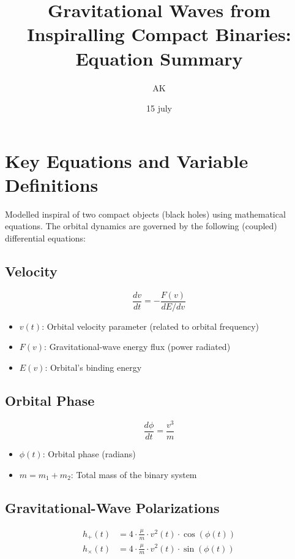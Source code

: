 \documentclass {article}
\title {Gravitational Waves from Inspiralling Compact Binaries: Equation Summary}
\author {AK}
\date {15 july}
\begin{document}
\maketitle

\section*{Key Equations and Variable Definitions}

Modelled inspiral of two compact objects (black holes) using mathematical equations. The orbital dynamics are governed by the following (coupled) differential equations:

\subsection*{Velocity}

\begin {equation}
\frac {dv}{dt} = -\frac {F(v)}{dE/dv}
\end {equation}

\begin {itemize}
  \item \( v(t) \): Orbital velocity parameter (related to orbital frequency)
  \item \( F(v) \): Gravitational-wave energy flux (power radiated)
  \item \( E(v) \): Orbital's binding energy
\end {itemize}

\subsection*{Orbital Phase}

\begin {equation}
\frac {d\phi}{dt} = \frac {v^3}{m}
\end {equation}

\begin {itemize}
  \item \( \phi(t) \): Orbital phase (radians)
  \item \( m = m_1 + m_2 \): Total mass of the binary system
\end{itemize}

\subsection*{Gravitational-Wave Polarizations}

\begin {align}
h_+(t) &= 4 \cdot \frac{\mu}{m} \cdot v^2(t) \cdot \cos(\phi(t)) \\
h_{\times}(t) &= 4 \cdot \frac{\mu}{m} \cdot v^2(t) \cdot \sin(\phi(t))
\end{align}
\end{document}
